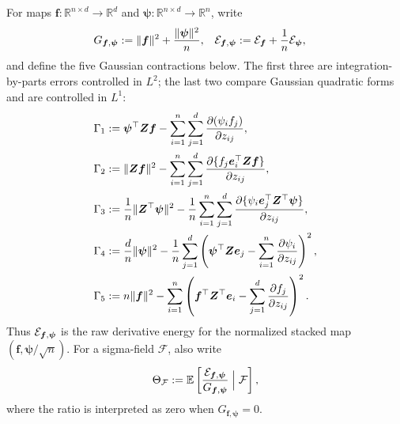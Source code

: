 \documentclass{article}
\theoremstyle{plain}
\theoremstyle{definition}
\theoremstyle{definition}
\DeclarePairedDelimiter\norm{\lVert}{\rVert}
\def\R{{\mathbb{R}}}
\def\E{{\mathbb{E}}}
\def\mathbold{\boldsymbol}
\def\bff{\mathbold{f}}\def\fhat{\widehat{f}}\def\hf{\widehat{f}}\def\ftil{\widetilde{f}}
\def\be{\mathbold{e}}
\def\bZ{\mathbold{Z}}\def\hbZ{{\widehat{\bZ}}}\def\tbZ{{\widetilde{\bZ}}}
\begin{document}
For maps $\bff:\R^{n\times d}\to\R^d$ and
$\boldsymbol\psi:\R^{n\times d}\to\R^n$, write
\begin{align*}
    G_{\bff,\boldsymbol\psi}
    &:=\norm{\bff}^2+\frac{\norm{\boldsymbol\psi}^2}{n},
    &
    \calE_{\bff,\boldsymbol\psi}
    &:=\calE_{\bff}+\frac1n\calE_{\boldsymbol\psi},
\end{align*}
and define the five Gaussian contractions below. The first three are
integration-by-parts errors controlled in $L^2$; the last two compare
Gaussian quadratic forms and are controlled in $L^1$:
\begin{align*}
    \Gamma_1
    &:={}
       \boldsymbol\psi^\top\bZ\bff
       -\sum_{i=1}^n\sum_{j=1}^d
          \pdv{(\psi_i f_j)}{z_{ij}},\\
    \Gamma_2
    &:={}
       \norm{\bZ\bff}^2
       -\sum_{i=1}^n\sum_{j=1}^d
          \pdv{\{f_j\be_i^\top\bZ\bff\}}{z_{ij}},\\
    \Gamma_3
    &:={}
       \frac1n\norm{\bZ^\top\boldsymbol\psi}^2
       -\frac1n\sum_{i=1}^n\sum_{j=1}^d
          \pdv{\{\psi_i\be_j^\top\bZ^\top\boldsymbol\psi\}}{z_{ij}},\\
    \Gamma_4
    &:={}
       \frac dn\norm{\boldsymbol\psi}^2
       -\frac1n\sum_{j=1}^d\left(
          \boldsymbol\psi^\top\bZ\be_j
          -\sum_{i=1}^n\pdv{\psi_i}{z_{ij}}
       \right)^2,\\
    \Gamma_5
    &:={}
       n\norm{\bff}^2
       -\sum_{i=1}^n\left(
          \bff^\top\bZ^\top\be_i
          -\sum_{j=1}^d\pdv{f_j}{z_{ij}}
       \right)^2.
\end{align*}
Thus $\calE_{\bff,\boldsymbol\psi}$ is the raw derivative energy for the
normalized stacked map $(\bff,\boldsymbol\psi/\sqrt n)$.
For a sigma-field $\mathcal F$, also write
\begin{align*}
    \Theta_{\mathcal F}
    :=\E\left[
       \frac{\calE_{\bff,\boldsymbol\psi}}
            {G_{\bff,\boldsymbol\psi}}
       \mathrel{\Big|}\mathcal F
    \right],
\end{align*}
where the ratio is interpreted as zero when
$G_{\bff,\boldsymbol\psi}=0$.
\end{document}
